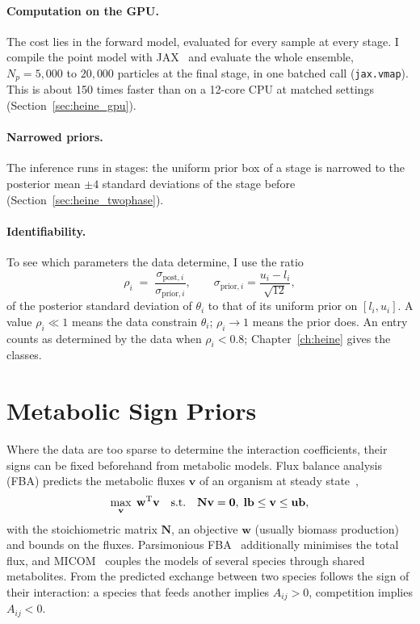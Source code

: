 \paragraph{Computation on the GPU.}
The cost lies in the forward model, evaluated for every sample at every stage.
I compile the point model with JAX~\cite{jax2018github} and evaluate the whole
ensemble, $N_p = 5{,}000$ to $20{,}000$ particles at the final stage, in one batched call
(\texttt{jax.vmap}). This is about 150 times faster than on a 12-core CPU at matched
settings (Section~\ref{sec:heine_gpu}).

\paragraph{Narrowed priors.}
The inference runs in stages: the uniform prior box of a stage is narrowed to the
posterior mean $\pm4$ standard deviations of the stage before
(Section~\ref{sec:heine_twophase}).

\paragraph{Identifiability.}
To see which parameters the data determine, I use the ratio
\begin{equation}
  \rho_i \;=\; \frac{\sigma_{\mathrm{post},i}}{\sigma_{\mathrm{prior},i}},
  \qquad \sigma_{\mathrm{prior},i}=\frac{u_i-l_i}{\sqrt{12}},
  \label{eq:effdim}
\end{equation}
of the posterior standard deviation of $\theta_i$ to that of its uniform prior on
$[l_i,u_i]$. A value $\rho_i \ll 1$ means the data constrain $\theta_i$; $\rho_i \to 1$
means the prior does. An entry counts as determined by the data when $\rho_i<0.8$;
Chapter~\ref{ch:heine} gives the classes.

\section{Metabolic Sign Priors}
\label{sec:theory_fba}

Where the data are too sparse to determine the interaction coefficients, their
signs can be fixed beforehand from metabolic models. Flux balance analysis
(FBA) predicts the metabolic fluxes $\mathbf v$ of an organism at steady
state~\cite{OrthThiele2010WhatIsFBA, Heinken2023AGORA2},
\begin{equation}
  \max_{\mathbf{v}}\; \mathbf{w}^{\rm T}\mathbf{v}
  \quad \text{s.t.} \quad \mathbf{N}\mathbf{v} = \mathbf{0},\; \mathbf{lb} \le \mathbf{v} \le \mathbf{ub},
\end{equation}
with the stoichiometric matrix $\mathbf N$, an objective $\mathbf w$ (usually biomass
production) and bounds on the fluxes. Parsimonious FBA~\cite{Lewis2012pFBA}
additionally minimises the total flux, and MICOM~\cite{Diener2020MICOM}
couples the models of several species through shared metabolites. From the
predicted exchange between two species follows the sign of their interaction:
a species that feeds another implies $A_{ij}>0$, competition implies
$A_{ij}<0$.

